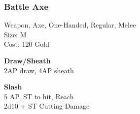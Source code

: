 \subsubsection{Battle Axe}\label{weapon:battleaxe}
Weapon, Axe, One-Handed, Regular, Melee\\
Size: M\\
Cost: 120 Gold

\textbf{Draw/Sheath}\\
2AP draw, 4AP sheath

\textbf{Slash}\\
5 AP, ST to hit,  Reach\\
2d10 + \texttimes ST Cutting Damage
